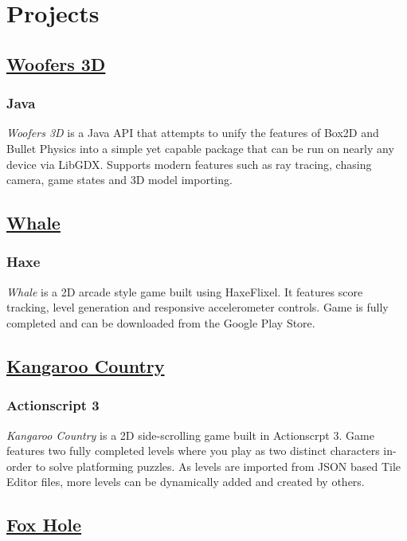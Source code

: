 \documentclass[letterpaper]{article}
\author{Jaxson Van Doorn}
\date{\today}
\title{}
\begin{document}
\section{Projects}
\label{sec:org87746bb}
\subsection{\href{https://github.com/woofers/woofers3d}{Woofers 3D}}
\label{sec:orgc731346}
\subsubsection{Java}
\label{sec:org844e686}
\emph{Woofers 3D} is a Java API that attempts to unify the features of Box2D and Bullet Physics into a simple yet capable package that can be run on nearly any device via LibGDX. Supports modern features such as ray tracing, chasing camera, game states and 3D model importing.
\subsection{\href{https://github.com/woofers/whale}{Whale}}
\label{sec:org3c56041}
\subsubsection{Haxe}
\label{sec:org856d708}
\emph{Whale} is a 2D arcade style game built using HaxeFlixel. It features score tracking, level generation and responsive accelerometer controls. Game is fully completed and can be downloaded from the Google Play Store.
\subsection{\href{https://github.com/woofers/kangaroo-country}{Kangaroo Country}}
\label{sec:orgec6edc6}
\subsubsection{Actionscript 3}
\label{sec:org307930d}
\emph{Kangaroo Country} is a 2D side-scrolling game built in Actionscrpt 3. Game features two fully completed levels where you play as two distinct characters in-order to solve platforming puzzles. As levels are imported from JSON based Tile Editor files, more levels can be dynamically added and created by others.
\subsection{\href{https://github.com/woofers/fox-hole}{Fox Hole}}
\label{sec:org4b96792}
\end{document}
